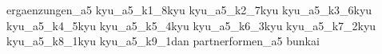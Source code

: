 
\usepackage{import}
\usepackage[backend=biber,style=alphabetic]{biblatex}%

\AtBeginBibliography{\scriptsize}

	\nocite{*}
	{ergaenzungen_a5}\clearpage\pagebreak
	{kyu_a5_k1_8kyu}\clearpage\pagebreak
	{kyu_a5_k2_7kyu}\clearpage\pagebreak
	{kyu_a5_k3_6kyu}\clearpage\pagebreak
	{kyu_a5_k4_5kyu}\clearpage\pagebreak
	{kyu_a5_k5_4kyu}\clearpage\pagebreak
	{kyu_a5_k6_3kyu}\clearpage\pagebreak
	{kyu_a5_k7_2kyu}\clearpage\pagebreak
	{kyu_a5_k8_1kyu}\clearpage\pagebreak
	{kyu_a5_k9_1dan}\clearpage\pagebreak
	{partnerformen_a5}\clearpage\pagebreak
	{bunkai}\clearpage\pagebreak
	\ClearShipoutPictureFG
	\twocolumn
	\printbibliography[title={\small Verwendete Literatur und Internetquellen}]


